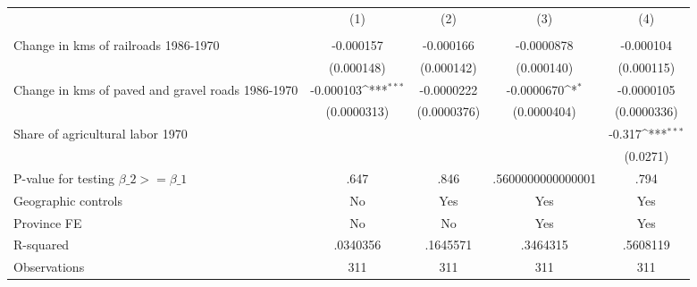{
\def\sym#1{\ifmmode^{#1}\else\(^{#1}\)\fi}
\begin{tabular}{l*{4}{c}}
\hline\hline
                &\multicolumn{1}{c}{(1)}&\multicolumn{1}{c}{(2)}&\multicolumn{1}{c}{(3)}&\multicolumn{1}{c}{(4)}\\
                &\multicolumn{1}{c}{}&\multicolumn{1}{c}{}&\multicolumn{1}{c}{}&\multicolumn{1}{c}{}\\
\hline
Change in kms of railroads 1986-1970&-0.000157         &-0.000166         &-0.0000878         &-0.000104         \\
                &(0.000148)         &(0.000142)         &(0.000140)         &(0.000115)         \\
[1em]
Change in kms of paved and gravel roads 1986-1970&-0.000103\sym{***}&-0.0000222         &-0.0000670\sym{*}  &-0.0000105         \\
                &(0.0000313)         &(0.0000376)         &(0.0000404)         &(0.0000336)         \\
[1em]
Share of agricultural labor 1970&                  &                  &                  &   -0.317\sym{***}\\
                &                  &                  &                  & (0.0271)         \\
\hline
P-value for testing $\beta\_{2} >= \beta\_{1}$&     .647         &     .846         &.5600000000000001         &     .794         \\
Geographic controls&       No         &      Yes         &      Yes         &      Yes         \\
Province FE     &       No         &       No         &      Yes         &      Yes         \\
R-squared       & .0340356         & .1645571         & .3464315         & .5608119         \\
Observations    &      311         &      311         &      311         &      311         \\
\hline\hline
\end{tabular}
}
